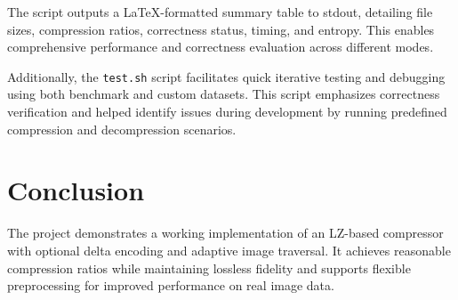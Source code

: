\documentclass[a4paper,12pt]{article}
\begin{document}
    The script outputs a LaTeX-formatted summary table to stdout, detailing file sizes, compression ratios, correctness status, timing, and entropy. This enables comprehensive performance and correctness evaluation across different modes.

    Additionally, the \texttt{test.sh} script facilitates quick iterative testing and debugging using both benchmark and custom datasets. This script emphasizes correctness verification and helped identify issues during development by running predefined compression and decompression scenarios.




    \section{Conclusion}
    The project demonstrates a working implementation of an LZ-based compressor with optional delta encoding and adaptive image traversal. It achieves reasonable compression ratios while maintaining lossless fidelity and supports flexible preprocessing for improved performance on real image data.

    \vfill


    \newpage

    
    \begin{flushleft}
        
    \end{flushleft}
\end{document}
